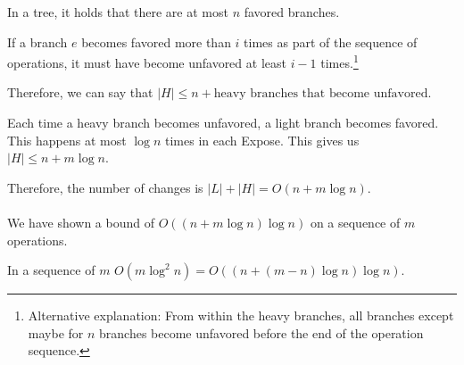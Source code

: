 \documentclass[a4paper]{article}
\begin{document}
In a tree, it holds that there are at most $n$ favored branches.

If a branch $e$ becomes favored more than $i$ times as part of the sequence of operations, it must have become unfavored at least $i-1$ times.\footnote{Alternative explanation: From within the heavy branches, all branches except maybe for $n$ branches become unfavored before the end of the operation sequence.}

Therefore, we can say that $|H| \le n + \text{heavy branches that become unfavored}$.

Each time a heavy branch becomes unfavored, a light branch becomes favored.
This happens at most $\log n$ times in each Expose. This gives us $|H| \le n + m\log n$.

Therefore, the number of changes is $|L| + |H| = O(n + m \log n)$.

\paragraph{}
We have shown a bound of $O((n+m\log n) \log n)$ on a sequence of $m$ operations.

In a sequence of $m$ 
$O(m \log^2 n)= O((n+(m-n)\log n)\log n)$.
\end{document}
